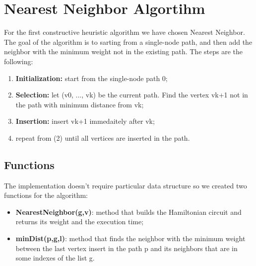 \section{Nearest Neighbor Algortihm}\label{nearest}
For the first constructive heuristic algorithm we have chosen Nearest Neighbor. The goal of the algorithm is to sarting from a single-node path, and then add the neighbor with the minimum weight not in the existing path. The steps are the following:\\

\begin{enumerate}
	\item  \textbf{Initialization:} start from the single-node path 0;
	\item  \textbf{Selection:} let (v0, ..., vk) be the current path. Find the vertex vk+1 not in the path with minimum distance from vk;
	\item  \textbf{Insertion:} insert vk+1 immedaitely after vk;
	\item repeat from (2) until all vertices are inserted in the path.
\end{enumerate}  


\subsection{Functions}
The implementation doesn't require particular data structure so we created two functions for the algorithm:
\begin{itemize}
	\item  \textbf{NearestNeighbor(g,v)}: method that builds the Hamiltonian circuit and returns its weight and the execution time;
	\item  \textbf{minDist(p,g,l)}: method that finds the neighbor with the minimum weight between the last vertex insert in the path p and its neighbors that are in some indexes of the list g.
\end{itemize}


